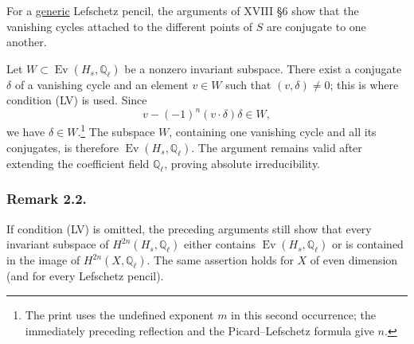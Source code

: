 For a \underline{generic} Lefschetz pencil, the arguments of XVIII §6 show
that the vanishing cycles attached to the different points of $S$ are
conjugate to one another.

Let $W\subset\operatorname{Ev}(H_s,\mathbb Q_\ell)$ be a nonzero invariant
subspace.  There exist a conjugate $\delta$ of a vanishing cycle and an
element $v\in W$ such that $(v,\delta)\ne0$; this is where condition (LV) is
used.  Since
\[
v-(-1)^n(v\cdot\delta)\delta\in W,
\]
we have $\delta\in W$.\footnote{The print uses the undefined exponent $m$ in
this second occurrence; the immediately preceding reflection and the
Picard--Lefschetz formula give $n$.}  The subspace $W$, containing one
vanishing cycle and all its conjugates, is therefore
$\operatorname{Ev}(H_s,\mathbb Q_\ell)$.  The argument remains valid after
extending the coefficient field $\mathbb Q_\ell$, proving absolute
irreducibility.

\subsubsection*{Remark 2.2.}
If condition (LV) is omitted, the preceding arguments still show that every
invariant subspace of $H^{2n}(H_s,\mathbb Q_\ell)$ either contains
$\operatorname{Ev}(H_s,\mathbb Q_\ell)$ or is contained in the image of
$H^{2n}(X,\mathbb Q_\ell)$.  The same assertion holds for $X$ of even
dimension (and for every Lefschetz pencil).

